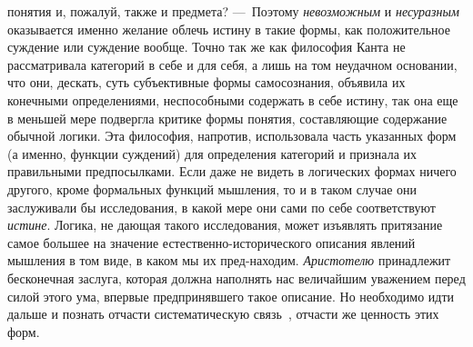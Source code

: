 \documentclass[twoside]{article}
\begin{document}
{{понятия и, пожалуй, также и предмета? —~Поэтому
{\em невозможным} и
{\em несуразным}
оказывается именно желание облечь истину в такие формы, как
положительное суждение или суждение вообще. Точно так же как философия
Канта не рассматривала категорий в себе и для себя, а лишь на том неудачном
основании, что они, дескать, суть субъективные формы самосознания, объявила
их конечными определениями, неспособными содержать в себе истину, так она
еще в меньшей мере подвергла критике формы понятия, составляющие содержание
обычной логики. Эта философия, напротив, использовала часть указанных форм
(а именно, функции суждений) для определения категорий и признала их
правильными предпосылками. Если даже не видеть в логических формах ничего
другого, кроме формальных функций мышления, то и в таком случае они
заслуживали бы исследования, в какой мере они сами по себе соответствуют
{\em истине}. Логика, не
дающая такого исследования, может изъявлять притязание самое большее на
значение естественно-исторического описания явлений мышления в том виде, в
каком мы их пред-находим.
{\em Аристотелю}
принадлежит бесконечная заслуга, которая должна наполнять нас
величайшим уважением перед силой этого ума, впервые предпринявшего такое
описание. Но необходимо идти дальше и познать отчасти систематическую
связь~\label{bkm:bm12},
отчасти же ценность этих форм.

}}
\end{document}
